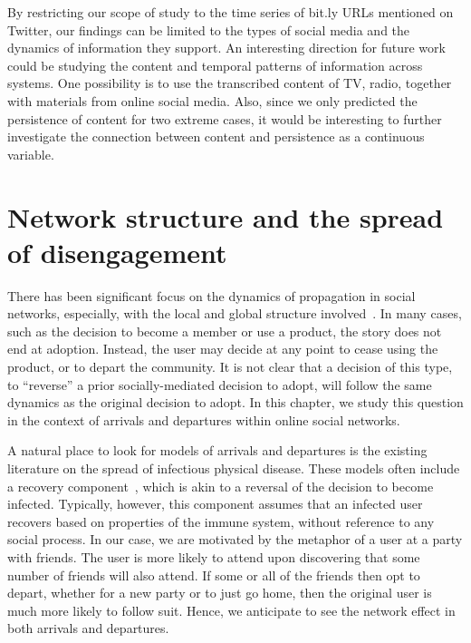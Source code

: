 \documentclass[phd,tocprelim]{cornell}
\begin{document}
By restricting our scope of study to the time series of bit.ly URLs mentioned on Twitter, our findings can be limited to the types of social media and the dynamics of information they support. An interesting direction for future work could be studying the content and temporal patterns of information across systems. One possibility is to use the transcribed content of TV, radio, together with materials from online social media. Also, since we only predicted the persistence of content for two extreme cases, it would be interesting to further investigate the connection between content and persistence as a continuous variable.


\chapter{Network structure and the spread of disengagement}
\label{chap:network}


There has been significant focus on the dynamics of propagation in social networks, especially, with the local and global structure involved~\cite{Newman:2002,Dodds:2005,Bakshy-2011,Leskovec:2007,Backstrom:2006,Romero-2011,Nowell-2008,Gruhl-2004}. In many cases, such as the decision to become a member or use a product, the story does not end at
adoption.  Instead, the user may decide at any point to cease using
the product, or to depart the community.  It is not clear that a
decision of this type, to ``reverse'' a prior socially-mediated
decision to adopt, will follow the same dynamics as the original
decision to adopt.  In this chapter, we study this question in the
context of arrivals and departures within online social networks.

A natural place to look for models of arrivals and departures is the
existing literature on the spread of infectious physical disease.
These models often include a recovery component~\cite{Newman:2002,
  Dodds:2005}, which is akin to a reversal of the decision to become
infected.  Typically, however, this component assumes that an infected
user recovers based on properties of the immune system, without
reference to any social process.  In our case, we are motivated by the
metaphor of a user at a party with friends.  The user is more likely
to attend upon discovering that some number of friends will also
attend.  If some or all of the friends then opt to depart, whether for
a new party or to just go home, then the original user is
much more likely to follow suit.  Hence, we anticipate to see the network effect in both arrivals and departures.
\end{document}
